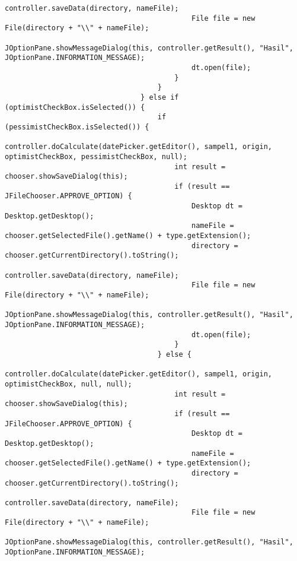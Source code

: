 \begin{lstlisting}[caption= main.java]
                                            controller.saveData(directory, nameFile);
                                            File file = new File(directory + "\\" + nameFile);
                                            JOptionPane.showMessageDialog(this, controller.getResult(), "Hasil", JOptionPane.INFORMATION_MESSAGE);
                                            dt.open(file);
                                        }
                                    }
                                } else if (optimistCheckBox.isSelected()) {
                                    if (pessimistCheckBox.isSelected()) {
                                        controller.doCalculate(datePicker.getEditor(), sampel1, origin, optimistCheckBox, pessimistCheckBox, null);
                                        int result = chooser.showSaveDialog(this);
                                        if (result == JFileChooser.APPROVE_OPTION) {
                                            Desktop dt = Desktop.getDesktop();
                                            nameFile = chooser.getSelectedFile().getName() + type.getExtension();
                                            directory = chooser.getCurrentDirectory().toString();
                                            controller.saveData(directory, nameFile);
                                            File file = new File(directory + "\\" + nameFile);
                                            JOptionPane.showMessageDialog(this, controller.getResult(), "Hasil", JOptionPane.INFORMATION_MESSAGE);
                                            dt.open(file);
                                        }
                                    } else {
                                        controller.doCalculate(datePicker.getEditor(), sampel1, origin, optimistCheckBox, null, null);
                                        int result = chooser.showSaveDialog(this);
                                        if (result == JFileChooser.APPROVE_OPTION) {
                                            Desktop dt = Desktop.getDesktop();
                                            nameFile = chooser.getSelectedFile().getName() + type.getExtension();
                                            directory = chooser.getCurrentDirectory().toString();
                                            controller.saveData(directory, nameFile);
                                            File file = new File(directory + "\\" + nameFile);
                                            JOptionPane.showMessageDialog(this, controller.getResult(), "Hasil", JOptionPane.INFORMATION_MESSAGE);

\end{lstlisting}
